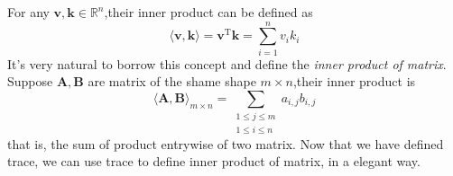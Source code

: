 \documentclass{article}
\newcommand{\Transpose}{\ensuremath{\mathrm{T}}}
\newcommand{\MatrixSymbol}[1]{\ensuremath{{\boldsymbol{#1}}}}
\theoremstyle{nonumberplain}
\begin{document}
For any $\MatrixSymbol{v},\MatrixSymbol{k}\in\mathbb{R}^n$,their inner product can be defined as 
\begin{equation*}
    \langle \MatrixSymbol{v},\MatrixSymbol{k} \rangle=\MatrixSymbol{v}^\Transpose\MatrixSymbol{k}=\sum_{i=1}^n v_ik_i
\end{equation*} 
It's very natural to borrow this concept and define the \textit{inner product of matrix}. Suppose $\MatrixSymbol{A},\MatrixSymbol{B}$ are matrix of the shame shape $m\times n$,their inner product is
\begin{equation*}
    \langle \MatrixSymbol{A},\MatrixSymbol{B} \rangle_{m\times n} =\sum_{\substack{1\leqslant j\leqslant m\\1\leqslant i\leqslant n} }a_{i,j}b_{i,j}
\end{equation*}
that is, the sum of product entrywise of two matrix. Now that we have defined trace, we can use trace to define inner product of matrix, in a elegant way.
\end{document}

